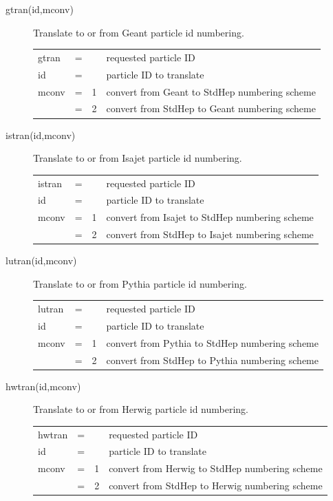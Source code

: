\begin{description}
\item[gtran(id,mconv)] Translate to or from Geant particle id numbering.

\begin{tabular}{lcll}
gtran & = &   & requested particle ID \\
id    & = &   & particle ID to translate \\
mconv & = & 1 & convert from Geant to StdHep numbering scheme \\
      & = & 2 & convert from StdHep to Geant numbering scheme \\
\end{tabular}

\item[istran(id,mconv)] Translate to or from Isajet particle id numbering.

\begin{tabular}{lcll}
istran & = &   & requested particle ID \\
id     & = &   & particle ID to translate \\
mconv  & = & 1 & convert from Isajet to StdHep numbering scheme \\
       & = & 2 & convert from StdHep to Isajet numbering scheme \\
\end{tabular}

\item[lutran(id,mconv)] Translate to or from Pythia particle id numbering.

\begin{tabular}{lcll}
lutran & = &   & requested particle ID \\
id     & = &   & particle ID to translate \\
mconv  & = & 1 & convert from Pythia to StdHep numbering scheme \\
       & = & 2 & convert from StdHep to Pythia numbering scheme \\
\end{tabular}

\item[hwtran(id,mconv)] Translate to or from Herwig particle id numbering.

\begin{tabular}{lcll}
hwtran & = &   & requested particle ID \\
id     & = &   & particle ID to translate \\
mconv  & = & 1 & convert from Herwig to StdHep numbering scheme \\
       & = & 2 & convert from StdHep to Herwig numbering scheme \\
\end{tabular}


\end{description}
